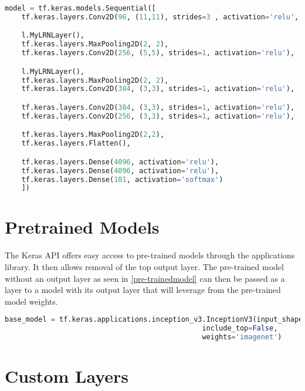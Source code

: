 \begin{lstlisting}[language=Python, caption=Single frame model implemetation, label=singleFrame]
    model = tf.keras.models.Sequential([
    tf.keras.layers.Conv2D(96, (11,11), strides=3 , activation='relu', input_shape=(170, 170, 3)),

    l.MyLRNLayer(),
    tf.keras.layers.MaxPooling2D(2, 2),
    tf.keras.layers.Conv2D(256, (5,5), strides=1, activation='relu'),

    l.MyLRNLayer(),
    tf.keras.layers.MaxPooling2D(2, 2),
    tf.keras.layers.Conv2D(384, (3,3), strides=1, activation='relu'),

    tf.keras.layers.Conv2D(384, (3,3), strides=1, activation='relu'),
    tf.keras.layers.Conv2D(256, (3,3), strides=1, activation='relu'),

    tf.keras.layers.MaxPooling2D(2,2),
    tf.keras.layers.Flatten(),

    tf.keras.layers.Dense(4096, activation='relu'),
    tf.keras.layers.Dense(4096, activation='relu'),
    tf.keras.layers.Dense(101, activation='softmax')
    ])
\end{lstlisting}

\section{Pretrained Models}
The Keras API offers easy access to pre-trained models through the applications library. It then allows removal of the top output layer. The pre-trained model without an output layer as seen in  \ref{pre-trainedmodel} can then be passed as a layer to a model with its output layer that will leverage from the pre-trained model weights. 

\begin{lstlisting}[language=Python, caption=Implemeting a pre-trained model called inception with the Keras API, label=pre-trainedmodel]
base_model = tf.keras.applications.inception_v3.InceptionV3(input_shape=IMG_SHAPE,
                                               include_top=False,
                                               weights='imagenet')

\end{lstlisting}

\section{Custom Layers}

